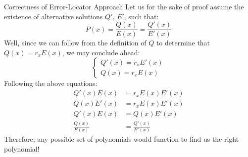 \begin{ln-theorem}{Correctness of Error-Locator Approach}{}
    Let us for the sake of proof assume the existence of alternative solutions $Q'$, $E'$, such that:
    \[P(x) = \frac{Q(x)}{E(x)} = \frac{Q'(x)}{E'(x)}\]
    Well, since we can follow from the definition of $Q$ to determine that $Q(x) = r_x E(x)$, we may conclude ahead:
    \[
        \begin{cases}
            Q'(x) = r_x E'(x) \\
            Q(x) = r_x E(x)
        \end{cases}
    \]
    Following the above equations:
    \begin{align*}
        Q'(x) E(x) &= r_x E(x) E'(x) \\
        Q(x) E'(x) &= r_x E(x) E'(x) \\
        Q'(x) E(x) &= Q(x) E'(x) \\
        \frac{Q(x)}{E(x)} &= \frac{Q'(x)}{E'(x)}
    \end{align*}
    Therefore, any possible set of polynomials would function to find us the right polynomial!
\end{ln-theorem}
